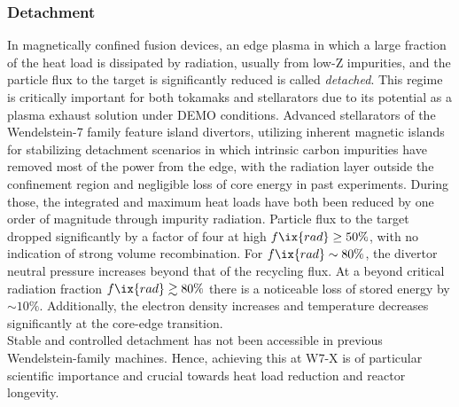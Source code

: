             \subsubsection*{Detachment}%
%
                In magnetically confined fusion devices, an edge plasma in which a large fraction of the heat load is dissipated by radiation, usually from low-Z impurities, and the particle flux to the target is significantly reduced is called \textit{detached}. This regime is critically important for both tokamaks and stellarators due to its potential as a plasma exhaust solution under DEMO conditions. Advanced stellarators of the Wendelstein-7 family feature island divertors, utilizing inherent magnetic islands for stabilizing detachment scenarios in which intrinsic carbon impurities have removed most of the power from the edge, with the radiation layer outside the confinement region and negligible loss of core energy in past experiments. During those, the integrated and maximum heat loads have both been reduced by one order of magnitude through impurity radiation. Particle flux to the target dropped significantly by a factor of four at high $f\ix{rad}\ge50\%$, with no indication of strong volume recombination. For $f\ix{rad}\sim80\%$, the divertor neutral pressure increases beyond that of the recycling flux. At a beyond critical radiation fraction $f\ix{rad}\gtrsim80\%$ there is a noticeable loss of stored energy by $\sim10\%$. Additionally, the electron density increases and temperature decreases significantly at the core-edge transition.\cite{Feng2021}\\%
                Stable and controlled detachment has not been accessible in previous Wendelstein-family machines. Hence, achieving this at W7-X is of particular scientific importance and crucial towards heat load reduction and reactor longevity.%
%